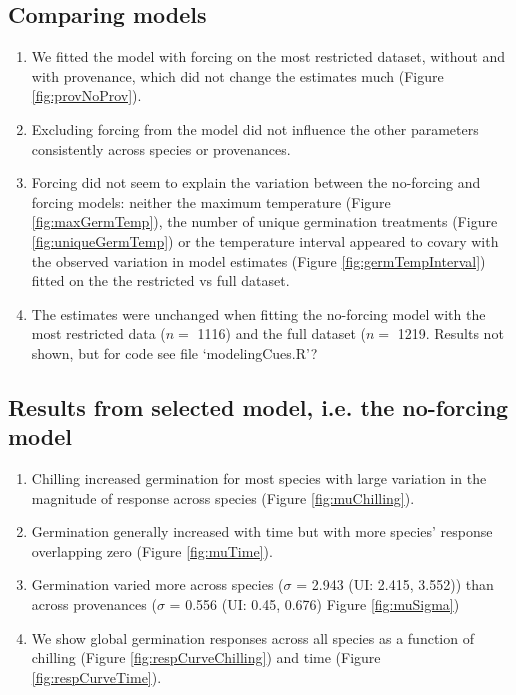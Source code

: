 \documentclass{article}\usepackage[]{graphicx}\usepackage[]{xcolor}
\begin{document}
\subsection*{Comparing models}
  \begin{enumerate}
  
  \item We fitted the model with forcing on the most restricted dataset, without and with provenance, which did not change the estimates much (Figure \ref{fig:provNoProv}).
  
  \item Excluding forcing from the model did not influence the other parameters consistently across species or provenances.
  
  \item Forcing did not seem to explain the variation between the no-forcing and forcing models: neither the maximum temperature (Figure \ref{fig:maxGermTemp}), the number of unique germination treatments (Figure \ref{fig:uniqueGermTemp}) or the temperature interval appeared to covary with the observed variation in model estimates (Figure \ref{fig:germTempInterval}) fitted on the the restricted vs full dataset.

  \item The estimates were unchanged when fitting the no-forcing model with the most restricted data ($n =$ 1116) and the full dataset ($n =$ 1219. Results not shown, but for code see file `modelingCues.R'?
  

  \end{enumerate}

\subsection*{Results from selected model, i.e. the no-forcing model}
\begin{enumerate}

  \item Chilling increased germination for most species with large variation in the magnitude of response across species (Figure \ref{fig:muChilling}).
  
  \item Germination generally increased with time but with more species' response overlapping zero (Figure \ref{fig:muTime}).
  
  \item Germination varied more across species ($\sigma$ =
  2.943 (UI:
  2.415,
  3.552)) than across provenances ($\sigma$ =
  0.556 (UI:
  0.45,
  0.676) Figure \ref{fig:muSigma})
  
  \item We show global germination responses across all species as a function of chilling (Figure \ref{fig:respCurveChilling}) and time (Figure \ref{fig:respCurveTime}).
  
\end{enumerate}
  
\end{document}

